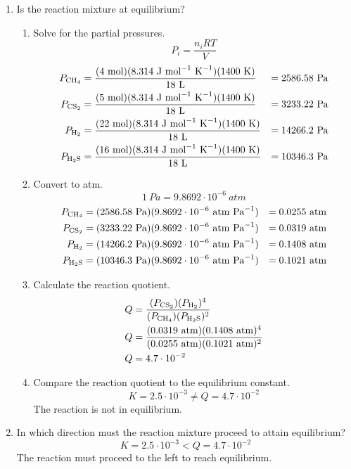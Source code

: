 \documentclass{article}
\begin{document}
\begin{enumerate}
    \item Is the reaction mixture at equilibrium?
    \begin{enumerate}
        \item Solve for the partial pressures.
        $$P_{i} = \frac{n_{i} R T}{V}$$
        \begin{align*}
            P_{\ce{CH_{4}}} &= \frac{(4\ \si{mol})(8.314\ \si{J\ mol^{-1}\ K^{-1}})(1400\ \si{K})}{18\ \si{L}}&=2586.58\ \si{Pa}\\
            P_{\ce{CS_{2}}} &= \frac{(5\ \si{mol})(8.314\ \si{J\ mol^{-1}\ K^{-1}})(1400\ \si{K})}{18\ \si{L}}&=3233.22\ \si{Pa}\\
            P_{\ce{H_{2}}} &= \frac{(22\ \si{mol})(8.314\ \si{J\ mol^{-1}\ K^{-1}})(1400\ \si{K})}{18\ \si{L}}&=14266.2\ \si{Pa}\\
            P_{\ce{H_{2}S}} &= \frac{(16\ \si{mol})(8.314\ \si{J\ mol^{-1}\ K^{-1}})(1400\ \si{K})}{18\ \si{L}}&=10346.3\ \si{Pa}
        \end{align*} 
        \item Convert to \si{atm}.
        $$1\ \si{Pa} = 9.8692\cdot10^{-6}\ \si{atm}$$
        \begin{align*}
            P_{\ce{CH_{4}}} &= (2586.58\ \si{Pa})(9.8692\cdot10^{-6}\ \si{atm\ Pa^{-1}}) &= 0.0255\ \si{atm}\\
            P_{\ce{CS_{2}}} &= (3233.22\ \si{Pa})(9.8692\cdot10^{-6}\ \si{atm\ Pa^{-1}}) &= 0.0319\ \si{atm}\\
            P_{\ce{H_{2}}} &= (14266.2\ \si{Pa})(9.8692\cdot10^{-6}\ \si{atm\ Pa^{-1}}) &= 0.1408\ \si{atm}\\
            P_{\ce{H_{2}S}} &= (10346.3\ \si{Pa})(9.8692\cdot10^{-6}\ \si{atm\ Pa^{-1}}) &= 0.1021\ \si{atm}
        \end{align*} 
        \item Calculate the reaction quotient.
        \begin{align*}
            Q&=\frac{(P_{\ce{CS_{2}}})(P_{\ce{H_{2}}})^{4}}{(P_{\ce{CH_{4}}})(P_{\ce{H_{2}S}})^{2}}\\
            Q&=\frac{(0.0319\ \si{atm})(0.1408\ \si{atm})^{4}}{(0.0255\ \si{atm})(0.1021\ \si{atm})^{2}}\\
            Q&=4.7\cdot10^{-2}
        \end{align*}
        \item Compare the reaction quotient to the equilibrium constant.
        $$K=2.5\cdot10^{-3} \ne Q=4.7\cdot10^{-2}$$
        The reaction is not in equilibrium.
    \end{enumerate}
    \item In which direction must the reaction mixture proceed to attain equilibrium?
    $$K=2.5\cdot10^{-3} < Q=4.7\cdot10^{-2}$$
    The reaction must proceed to the left to reach equilibrium.
    
\end{enumerate}
\end{document}
